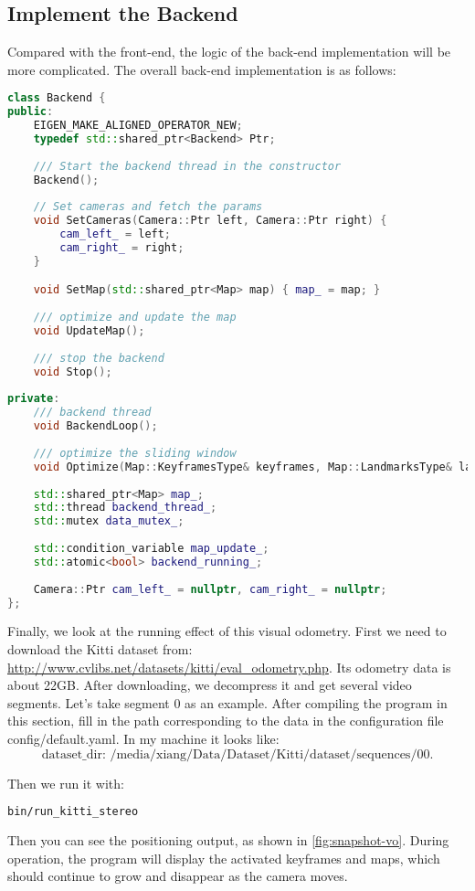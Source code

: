 \subsection{Implement the Backend}
Compared with the front-end, the logic of the back-end implementation will be more complicated. The overall back-end implementation is as follows:
\begin{lstlisting}[language=c++,caption=slambook2/ch13/include/myslam/backend.h]
class Backend {
public:
	EIGEN_MAKE_ALIGNED_OPERATOR_NEW;
	typedef std::shared_ptr<Backend> Ptr;
	
	/// Start the backend thread in the constructor 
	Backend();
	
	// Set cameras and fetch the params
	void SetCameras(Camera::Ptr left, Camera::Ptr right) {
		cam_left_ = left;
		cam_right_ = right;
	}

	void SetMap(std::shared_ptr<Map> map) { map_ = map; }
	
	/// optimize and update the map
	void UpdateMap();
	
	/// stop the backend
	void Stop();
	
private:
	/// backend thread
	void BackendLoop();
	
	/// optimize the sliding window
	void Optimize(Map::KeyframesType& keyframes, Map::LandmarksType& landmarks);
	
	std::shared_ptr<Map> map_;
	std::thread backend_thread_;
	std::mutex data_mutex_;
	
	std::condition_variable map_update_;
	std::atomic<bool> backend_running_;
	
	Camera::Ptr cam_left_ = nullptr, cam_right_ = nullptr;
};
\end{lstlisting}

Finally, we look at the running effect of this visual odometry. First we need to download the Kitti dataset from: \url{http://www.cvlibs.net/datasets/kitti/eval_odometry.php}. Its odometry data is about 22GB. After downloading, we decompress it and get several video segments. Let's take segment 0 as an example. After compiling the program in this section, fill in the path corresponding to the data in the configuration file config/default.yaml. In my machine it looks like:
$$\text{dataset_dir: /media/xiang/Data/Dataset/Kitti/dataset/sequences/00}.$$

Then we run it with:
\begin{lstlisting}[language=sh,caption=Terminal input:]
	bin/run_kitti_stereo
\end{lstlisting}
Then you can see the positioning output, as shown in \autoref{fig:snapshot-vo}. During operation, the program will display the activated keyframes and maps, which should continue to grow and disappear as the camera moves.

